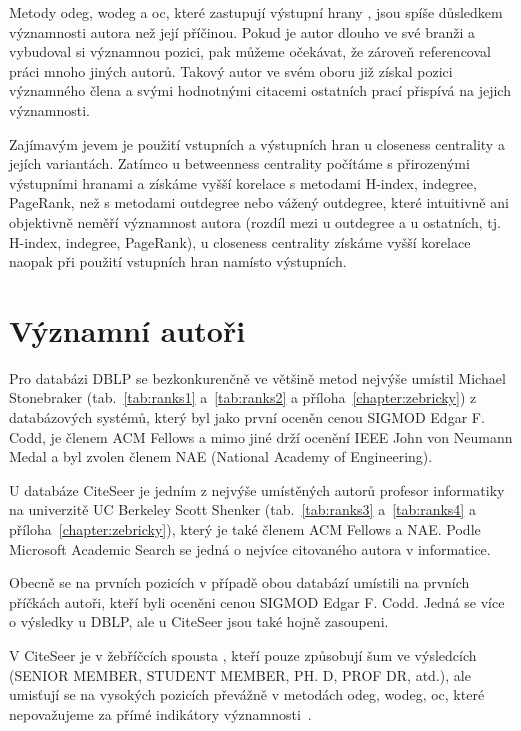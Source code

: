 \documentclass{bakalarka}
\begin{document}
Metody odeg, wodeg a oc, které zastupují výstupní hrany , jsou spíše
důsledkem významnosti autora než její příčinou. Pokud je autor dlouho ve své
branži a vybudoval si významnou pozici, pak můžeme očekávat, že zároveň
referencoval práci mnoho jiných autorů.  Takový autor ve svém oboru již získal
pozici významného člena a svými hodnotnými citacemi ostatních prací přispívá na
jejich významnosti.

Zajímavým jevem je použití vstupních a výstupních hran u closeness centrality a
jejích variantách. Zatímco u betweenness centrality počítáme s přirozenými
výstupními hranami a získáme vyšší korelace s metodami H-index, indegree,
PageRank, než s metodami outdegree nebo vážený outdegree, které intuitivně ani
objektivně neměří významnost autora (rozdíl mezi  u outdegree a
 u ostatních, tj. H-index, indegree, PageRank), u closeness
centrality získáme vyšší korelace naopak při použití vstupních hran namísto
výstupních.

\section{Významní autoři}
Pro databázi DBLP se bezkonkurenčně ve většině metod nejvýše umístil Michael
Stonebraker (tab.~\ref{tab:ranks1} a~\ref{tab:ranks2} a příloha~\ref{chapter:zebricky}) z databázových systémů, který byl jako první oceněn cenou SIGMOD
Edgar F. Codd, je členem ACM Fellows a mimo jiné drží ocenění IEEE John von
Neumann Medal a byl zvolen členem NAE (National Academy of Engineering).

U databáze CiteSeer je jedním z nejvýše umístěných autorů profesor informatiky
na univerzitě UC Berkeley Scott Shenker (tab.~\ref{tab:ranks3}
a~\ref{tab:ranks4} a příloha~\ref{chapter:zebricky}), který je také členem ACM
Fellows a NAE. Podle Microsoft Academic Search se jedná o nejvíce citovaného
autora v informatice.

Obecně se na prvních pozicích v případě obou databází umístili na prvních
příčkách autoři, kteří byli oceněni cenou SIGMOD Edgar F. Codd. Jedná se více o
výsledky u DBLP, ale u CiteSeer jsou také hojně zasoupeni.

V CiteSeer je v žebříčcích spousta , kteří pouze způsobují šum ve
výsledcích (SENIOR MEMBER, STUDENT MEMBER, PH. D, PROF DR, atd.), ale umisťují
se na vysokých pozicích převážně v metodách odeg, wodeg, oc, které nepovažujeme
za přímé indikátory významnosti~\citep{mas}.
\end{document}
